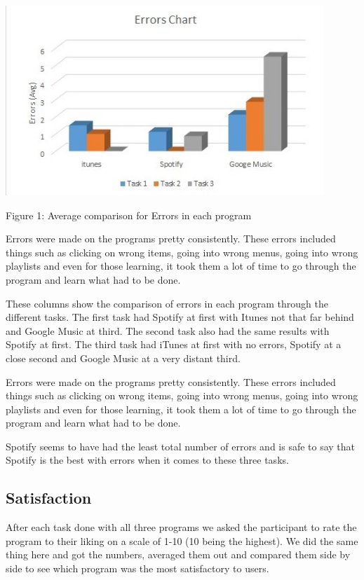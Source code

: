 \documentclass{article}
\begin{document}
\begin{center}
\includegraphics[width=120mm]{Errors.jpg}
\end{center}
\begin{center}
Figure 1: Average comparison for Errors in each program
\end{center}

Errors were made on the programs pretty consistently. These errors included things such as clicking on wrong items, going into wrong menus, going into wrong playlists  and even for those learning, it took them a lot of time to go through the program and learn what had to be done.

These columns show the comparison of errors in each program through the different tasks. The first task had Spotify at first with Itunes not that far behind and Google Music at third. The second task also had the same results with Spotify at first. The third task had iTunes at first with no errors, Spotify at a close second and Google Music at a very distant third.

Errors were made on the programs pretty consistently. These errors included things such as clicking on wrong items, going into wrong menus, going into wrong playlists  and even for those learning, it took them a lot of time to go through the program and learn what had to be done.

Spotify seems to have had the least total number of errors and is safe to say that Spotify is the best with errors when it comes to these three tasks.

\subsection{Satisfaction}
After each task done with all three programs we asked the participant to rate the program to their liking on a scale of 1-10 (10 being the highest). We did the same thing here and got the numbers, averaged them out and compared them side by side to see which program was the most satisfactory to users.
\end{document}
